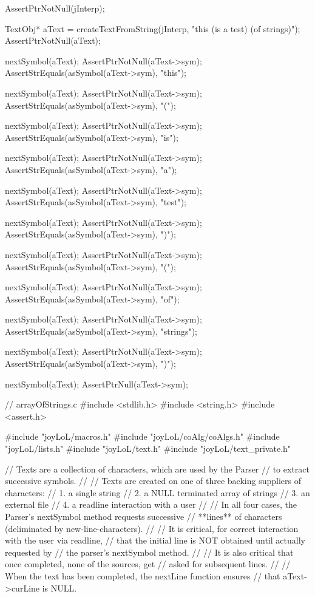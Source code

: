 \startCTest
  AssertPtrNotNull(jInterp);

  TextObj* aText =
    createTextFromString(jInterp, "this (is a test) (of strings)");
  AssertPtrNotNull(aText);

  nextSymbol(aText);
  AssertPtrNotNull(aText->sym);
  AssertStrEquals(asSymbol(aText->sym), "this");

  nextSymbol(aText);
  AssertPtrNotNull(aText->sym);
  AssertStrEquals(asSymbol(aText->sym), "(");

  nextSymbol(aText);
  AssertPtrNotNull(aText->sym);
  AssertStrEquals(asSymbol(aText->sym), "is");

  nextSymbol(aText);
  AssertPtrNotNull(aText->sym);
  AssertStrEquals(asSymbol(aText->sym), "a");

  nextSymbol(aText);
  AssertPtrNotNull(aText->sym);
  AssertStrEquals(asSymbol(aText->sym), "test");

  nextSymbol(aText);
  AssertPtrNotNull(aText->sym);
  AssertStrEquals(asSymbol(aText->sym), ")");

  nextSymbol(aText);
  AssertPtrNotNull(aText->sym);
  AssertStrEquals(asSymbol(aText->sym), "(");

  nextSymbol(aText);
  AssertPtrNotNull(aText->sym);
  AssertStrEquals(asSymbol(aText->sym), "of");

  nextSymbol(aText);
  AssertPtrNotNull(aText->sym);
  AssertStrEquals(asSymbol(aText->sym), "strings");

  nextSymbol(aText);
  AssertPtrNotNull(aText->sym);
  AssertStrEquals(asSymbol(aText->sym), ")");

  nextSymbol(aText);
  AssertPtrNull(aText->sym);
\stopCTest
\stopTestCase
\stopTestSuite

\starttyping
// arrayOfStrings.c
#include <stdlib.h>
#include <string.h>
#include <assert.h>

#include "joyLoL/macros.h"
#include "joyLoL/coAlg/coAlgs.h"
#include "joyLoL/lists.h"
#include "joyLoL/text.h"
#include "joyLoL/text_private.h"

// Texts are a collection of characters, which are used by the Parser
// to extract successive symbols.
//
// Texts are created on one of three backing suppliers of characters:
// 1. a single string
// 2. a NULL terminated array of strings
// 3. an external file
// 4. a readline interaction with a user
//
// In all four cases, the Parser's nextSymbol method requests successive
// **lines** of characters (deliminated by new-line-characters).
//
// It is critical, for correct interaction with the user via readline,
// that the initial line is NOT obtained until actually requested by
// the parser's nextSymbol method.
//
// It is also critical that once completed, none of the sources, get
// asked for subsequent lines.
//
// When the text has been completed, the nextLine function ensures
// that aText->curLine is NULL.

